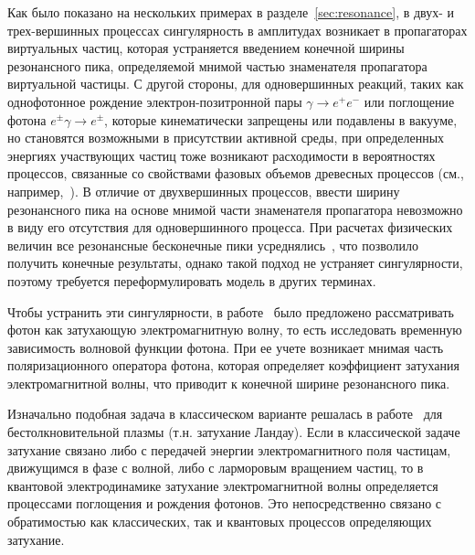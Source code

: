 Как было показано на нескольких примерах в разделе~\ref{sec:resonance}, в двух- 
и трех-вершинных процессах сингулярность в амплитудах возникает в пропагаторах 
виртуальных частиц, которая устраняется введением конечной ширины резонансного 
пика, определяемой мнимой частью знаменателя пропагатора виртуальной частицы. С 
другой 
стороны, для одновершинных реакций, таких как однофотонное 
рождение электрон-позитронной пары $\gamma\to e^+e^-$ или поглощение фотона 
$e^{\pm}\gamma\to e^{\pm}$, которые кинематически запрещены или подавлены в 
вакууме, но становятся возможными в присутствии активной среды, при 
определенных энергиях участвующих частиц тоже возникают 
расходимости в вероятностях процессов, связанные со свойствами фазовых объемов древесных процессов 
(см., 
например,~\cite{Klepikov:1954,Sturrock:1971,Tademaru:1973,Daugherty:1983,Shabad:1988}).
В отличие от двухвершинных процессов, ввести ширину резонансного пика на основе 
мнимой части знаменателя пропагатора невозможно в виду его отсутствия для 
одновершинного процесса.  При расчетах 
физических величин все резонансные бесконечные пики 
усреднялись~\cite{Baier:2007}, что позволило получить конечные результаты, 
однако такой подход не устраняет сингулярности, поэтому требуется 
переформулировать модель в других терминах. 

Чтобы устранить эти сингулярности, в работе~\cite{Shabad:1988} было предложено  
рассматривать фотон как затухающую электромагнитную волну, то есть исследовать 
временную зависимость волновой функции фотона.
При ее учете возникает мнимая часть поляризационного оператора фотона, которая 
определяет коэффициент затухания электромагнитной волны, что приводит к 
конечной ширине резонансного пика.

Изначально подобная задача в классическом варианте решалась в работе~\cite{Landau:1946} для бестолкновительной плазмы (т.н. затухание Ландау). Если в классической задаче затухание связано либо с 
передачей энергии электромагнитного поля частицам, движущимся в фазе с волной, 
либо с ларморовым вращением частиц, то в квантовой электродинамике затухание 
электромагнитной волны определяется процессами 
поглощения и рождения фотонов. Это непосредственно связано с обратимостью как классических, так и квантовых процессов определяющих затухание.

